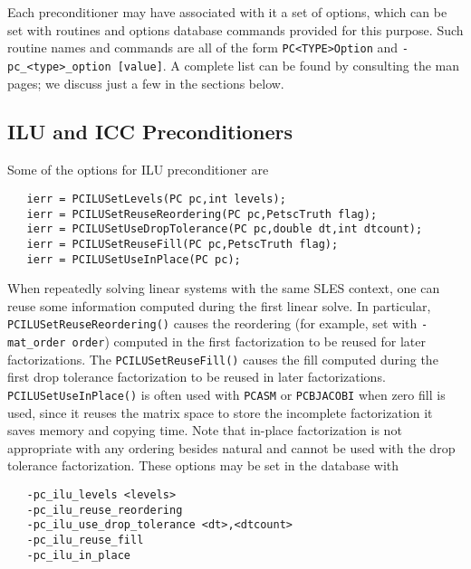 Each preconditioner may have associated with it a set of options,
which can be set with routines and options database commands provided
for this purpose.  Such routine names and commands are all of the form
{\tt PC<TYPE>Option} and {\tt -pc\_<type>\_option [value]}.  A
complete list can be found by consulting the man pages; we discuss
just a few in the sections below.

\subsection{ILU and ICC Preconditioners}
\label{sec:ilu_icc}

Some of the options for ILU preconditioner are 
\begin{verbatim}
   ierr = PCILUSetLevels(PC pc,int levels);
   ierr = PCILUSetReuseReordering(PC pc,PetscTruth flag);
   ierr = PCILUSetUseDropTolerance(PC pc,double dt,int dtcount);
   ierr = PCILUSetReuseFill(PC pc,PetscTruth flag);
   ierr = PCILUSetUseInPlace(PC pc); 
\end{verbatim}
 
 

When repeatedly solving linear systems with the same SLES
context, one can reuse some information  computed
during the first linear solve.
In particular, {\tt PCILUSetReuseReordering()} causes the reordering  (for example, set with 
{\tt -mat\_order order}) computed in the first factorization to be reused
for later factorizations.  
The {\tt  PCILUSetReuseFill()} causes the 
fill computed during the first drop tolerance factorization to be reused
in later factorizations. {\tt PCILUSetUseInPlace()} is often used with 
{\tt PCASM} or {\tt PCBJACOBI} when zero fill is used, since it reuses the 
matrix space to store the incomplete factorization it saves memory and 
copying time. Note that in-place factorization is not appropriate with 
any ordering besides natural and cannot be used with the drop tolerance
factorization. These options may be set in the database with 
\begin{verbatim}
   -pc_ilu_levels <levels>
   -pc_ilu_reuse_reordering
   -pc_ilu_use_drop_tolerance <dt>,<dtcount>
   -pc_ilu_reuse_fill
   -pc_ilu_in_place
\end{verbatim}
 
 

